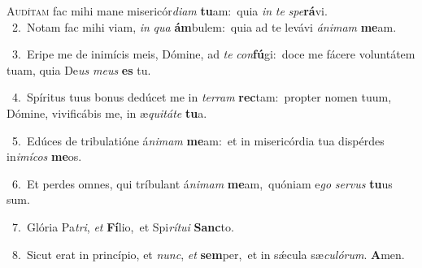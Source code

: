 \lettrine{\initial\textcolor{\initialcolor}{A}}{udítam} fac mihi mane misericór\-\textit{di}\-\textit{am} \textbf{tu}\-am:~\star quia \textit{in} \textit{te} \textit{spe}\-\textbf{rá}vi.\\
{\numbfont\textcolor{\numbcolor}{~2.}}~Notam fac mihi viam, \textit{in} \textit{qua} \textbf{ám}\-bulem:~\star quia ad te levávi \textit{á}\-\textit{ni}\textit{mam} \textbf{me}\-am.\par
{\numbfont\textcolor{\numbcolor}{~3.}}~Eripe me de inimícis meis, Dómine, ad \textit{te} \textit{con}\-\textbf{fú}gi:~\star doce me fácere voluntátem tuam, quia De\textit{us} \textit{me}\-\textit{us} \textbf{es} tu.\par
{\numbfont\textcolor{\numbcolor}{~4.}}~Spíritus tuus bonus dedúcet me in \textit{ter}\-\textit{ram} \textbf{rec}\-tam:~\star propter nomen tuum, Dómine, vivificábis me, in æ\-\textit{qui}\-\textit{tá}\textit{te} \textbf{tu}\-a.\par
{\numbfont\textcolor{\numbcolor}{~5.}}~Edúces de tribulatióne á\-\textit{ni}\-\textit{mam} \textbf{me}\-am:~\star et in misericórdia tua dispérdes in\-\textit{i}\-\textit{mí}\textit{cos} \textbf{me}\-os.\par
{\numbfont\textcolor{\numbcolor}{~6.}}~Et perdes omnes, qui tríbulant á\-\textit{ni}\-\textit{mam} \textbf{me}\-am,~\star quóniam e\textit{go} \textit{ser}\-\textit{vus} \textbf{tu}\-us sum.\par
{\numbfont\textcolor{\numbcolor}{~7.}}~Glória Pa\-\textit{tri}\-, \textit{et} \textbf{Fí}\-lio,~\star et Spi\-\textit{rí}\-\textit{tu}\textit{i} \textbf{Sanc}\-to.\par
{\numbfont\textcolor{\numbcolor}{~8.}}~Sicut erat in princípio, et \textit{nunc}\-, \textit{et} \textbf{sem}\-per,~\star et in sǽcula sæ\-\textit{cu}\-\textit{ló}\textit{rum}. \textbf{A}\-men.\par
